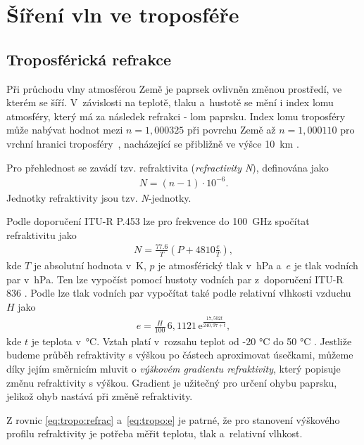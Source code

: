 \documentclass[twoside]{ctuthesis}
\newcommand{\mt}[1]{\text{#1}}
\theoremstyle{plain}
\theoremstyle{definition}
\theoremstyle{note}
\begin{document}
	\section{Šíření vln ve troposféře}
		\subsection{Troposférická refrakce}
		Při průchodu vlny atmosférou Země je paprsek ovlivněn změnou prostředí, ve kterém se šíří. V~závislosti na teplotě, tlaku a~hustotě se mění i index lomu atmosféry, který má za následek refrakci - lom paprsku. Index lomu troposféry může nabývat hodnot mezi $n=1{,}000325$ při povrchu Země až $n=1{,}000110$ pro vrchní hranici troposféry~\cite{zaklady:sireni:vln}, nacházející se přibližně ve výšce 10~km \cite{web_tropo}.

		Pro přehlednost se zavádí tzv. refraktivita (\textit{refractivity N}), definována jako
		\begin{align}
			N = (n-1)\cdot 10^{-6}.
		\end{align}
		Jednotky refraktivity jsou tzv. \textit{N}-jednotky.

		Podle doporučení ITU-R P.453 \cite{ITU:refrac} lze pro frekvence do 100~GHz spočítat refraktivitu jako
		\begin{align}
			N = \frac{77.6}{T} \left(P + 4810\frac{e}{T}\right),
			\label{eq:tropo:refrac}
		\end{align}
		kde $T$ je absolutní hodnota v~K, $p$ je atmosférický tlak v~hPa a~$e$ je tlak vodních par v~hPa. Ten lze vypočíst pomocí hustoty vodních par z~doporučení ITU-R 836 \cite{ITU:vapour}. Podle \cite{ITU:refrac} lze tlak vodních par vypočítat také podle relativní vlhkosti vzduchu $H$ jako
		\begin{align}
			e = \frac{H}{100}\,6{,}1121\,\mt{e}^{\frac{17{,}502t}{240{,}97 + t}},
			\label{eq:tropo:e}
		\end{align}
		kde $t$ je teplota v~°C. Vztah platí v~rozsahu teplot od -20 °C do 50 °C \cite{zaklady:sireni:vln}. Jestliže budeme průběh refraktivity s výškou po částech aproximovat úsečkami, můžeme díky jejím směrnicím mluvit o \textit{výškovém gradientu refraktivity}, který popisuje změnu refraktivity s výškou. Gradient je užitečný pro určení ohybu paprsku, jelikož ohyb nastává při změně refraktivity. 

		Z rovnic \eqref{eq:tropo:refrac} a~\eqref{eq:tropo:e} je patrné, že pro stanovení výškového profilu refraktivity je potřeba měřit teplotu, tlak a~relativní vlhkost. 
\end{document}
